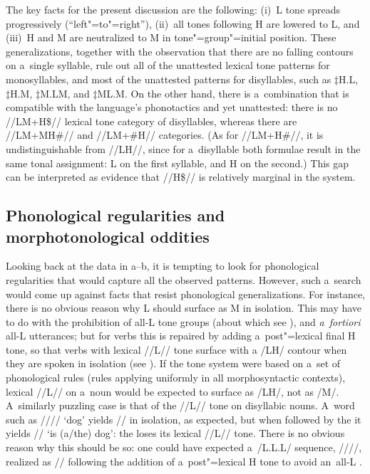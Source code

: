 {{{{{The key facts for the present discussion are
 the following: (i)~L tone spreads progressively (“left"=to"=right”), (ii)~all tones following H are lowered
 to L, and (iii)~H and M are neutralized to M in tone"=group"=initial position. These generalizations, together with the observation that there are no falling contours on a~single
syllable, rule out all of the unattested lexical tone patterns for monosyllables, and most of the unattested
patterns for disyllables, such as $\ddagger${\kern2pt}H.L, $\ddagger${\kern2pt}H.M, $\ddagger${\kern2pt}M.LM, and $\ddagger${\kern2pt}ML.M. On the other hand, there is a~combination that is compatible with the
language’s phonotactics and yet unattested: there is no //LM\mbox{+H\$//} lexical tone category of disyllables, whereas there
are //LM+MH\#// and //LM+\#H// categories. (As for \mbox{//LM}+\mbox{H\#//,} it is undistinguishable from
\mbox{//LH//}, since for a~disyllable both formulae result in the same tonal assignment: L on the first
syllable, and H on the second.) This gap can be interpreted as evidence that \mbox{//H\$//} is relatively marginal in the system.


\subsection{Phonological regularities and morphotonological oddities}
\label{sec:reflectionsonthestructureofthesystemphonologicalregularitiesandmorphophonologicaloddities}


Looking back at the data in a--b, it is tempting to look for phonological regularities that would
capture all the observed patterns. However, such a~search would come up against facts that resist phonological generalizations. 
For instance, there is no obvious reason
why L should surface as M in isolation. This may have to do with the prohibition of all-L tone
groups (about which see ), and \textit{a~fortiori} all-L utterances; but for verbs this is
repaired by adding a~post"=lexical final H tone, so that verbs with lexical \mbox{//L//} tone surface with a
\mbox{/LH/} contour when they are spoken in isolation (see ). If the tone system were based on a~set of
phonological rules (rules applying uniformly in all morphosyntactic contexts), lexical //L// on
a~noun would be expected to surface as /LH/, not as /M/. A~similarly puzzling case is that of the
//L// tone on disyllabic nouns. A~word such as //// ‘dog’ yields // in
isolation, as expected, but when followed by the  it yields // ‘is \mbox{(a/the)}
dog’: the  loses its lexical //L// tone. There is no obvious reason why this should be so: one
could have expected a~/L.L.L/ sequence, ////, realized as // following the addition of
a~post"=lexical H tone to avoid an~all-L .

}}}}}
